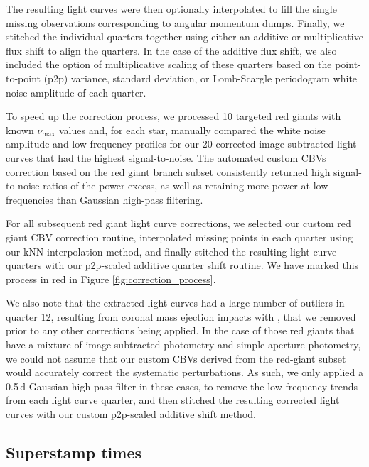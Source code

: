 The resulting light curves were then optionally interpolated to fill the single missing observations corresponding to angular momentum dumps. Finally, we stitched the individual quarters together using either an additive or multiplicative flux shift to align the quarters. In the case of the additive flux shift, we also included the option of multiplicative scaling of these quarters based on the point-to-point (p2p) variance, standard deviation, or Lomb-Scargle periodogram white noise amplitude of each quarter.

To speed up the correction process, we processed 10 \Kepler{} targeted red giants with known $\nu_\mathrm{max}$ values and, for each star, manually compared the white noise amplitude and low frequency profiles for our 20 corrected image-subtracted light curves that had the highest signal-to-noise. The automated custom CBVs correction based on the red giant branch subset consistently returned high signal-to-noise ratios of the power excess, as well as retaining more power at low frequencies than Gaussian high-pass filtering. 

For all subsequent red giant light curve corrections, we selected our custom red giant CBV correction routine, interpolated missing points in each quarter using our kNN interpolation method, and finally stitched the resulting light curve quarters with our p2p-scaled additive quarter shift routine. We have marked this process in red in Figure \ref{fig:correction_process}.

We also note that the extracted light curves had a large number of outliers in quarter 12, resulting from coronal mass ejection impacts with \Kepler{} \citep{van_cleve_kepler_2016}, that we removed prior to any other corrections being applied. In the case of those red giants that have a mixture of image-subtracted photometry and simple aperture photometry, we could not assume that our custom CBVs derived from the red-giant subset would accurately correct the systematic perturbations. As such, we only applied a 0.5\,d Gaussian high-pass filter in these cases, to remove the low-frequency trends from each light curve quarter, and then stitched the resulting corrected light curves with our custom p2p-scaled additive shift method.

\subsection{Superstamp times}

